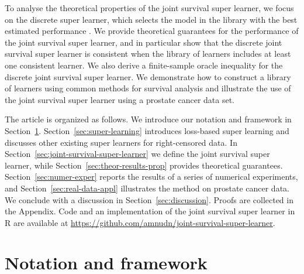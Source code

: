 \documentclass[a4paper,danish]{article}
\newcommand{\1}{\mathds{1}}
\theoremstyle{plain} %
\numberwithin{theorem}{section}
\theoremstyle{definition} %
\theoremstyle{remark}
\begin{document}
To analyse the theoretical properties of the joint survival super
learner, we focus on the discrete super learner, which selects the
model in the library with the best estimated performance
\citep{van2007super}. We provide theoretical guarantees for the
performance of the joint survival super learner, and in particular
show that the discrete joint survival super learner is consistent
when the library of learners includes at least one consistent
learner. We also derive a finite-sample oracle inequality for the
discrete joint survival super learner. We demonstrate how to construct
a library of learners using common methods for survival analysis and
illustrate the use of the joint survival super learner using a
prostate cancer data set.

The article is organized as follows. We introduce our notation and
framework in Section~\ref{sec:framework}.
Section~\ref{sec:super-learning} introduces loss-based super learning
and discusses other existing super learners for right-censored
data. In Section~\ref{sec:joint-survival-super-learner} we define the joint
survival super learner, while Section~\ref{sec:theor-results-prop}
provides theoretical guarantees. Section~\ref{sec:numer-exper} reports
the results of a series of numerical experiments, and
Section~\ref{sec:real-data-appl} illustrates the method on prostate
cancer data. We conclude with a discussion in
Section~\ref{sec:discussion}. Proofs are collected in the
Appendix. Code and an implementation of the joint survival super
learner in R \citep{R} are available at
\url{https://github.com/amnudn/joint-survival-super-learner}.

\section{Notation and framework}
\label{sec:framework}
\end{document}
